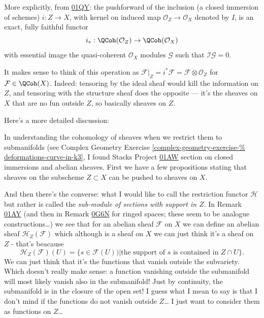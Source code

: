 \documentclass{book}
\begin{document}
More explicitly, from
\href{https://stacks.math.columbia.edu/tag/%
01QY}{01QY}:
the pushforward of the inclusion (a closed
immersion of schemes)
$i:Z \to X$, with kernel on induced map
$\mathcal{O}_Z \to \mathcal{O}_X$
denoted by $I$, is an exact, fully faithful
functor
$$
i_*:\QCoh(\mathcal{O}_Z) \to
\QCoh(\mathcal{O}_X)
$$
with essential image the quasi-coherent
$\mathcal{O}_X$ modules
$\mathcal{G}$ such that
$\mathcal{I}\mathcal{G}=0$.

It makes sense to think of this operation as
$\mathcal{F}|_Z=i^*\mathcal{F}=\mathcal{F}
\otimes\mathcal{O}_Z$
for $\mathcal{F}\in\QCoh(X)$.
Indeed: tensoring by the ideal sheaf would
kill the information on $Z$,
and tensoring with the structure sheaf does
the opposite
--- it's the sheaves on $X$ that are no fun
outside $Z$,
so basically sheaves on $Z$.

\medskip\noindent
Here's a more detailed discussion:

In understanding the cohomology of sheaves
when
we restrict them to submanifolds (see Complex
Geometry
Exercise
\ref{complex-geometry-exercise-%
deformations-curve-in-k3},
I found Stacks Project
\href{https://stacks.math.columbia.edu/tag/%
01AW}{01AW}
section on closed immersions and abelian
sheaves.
First we have a few propositions stating that
sheaves on the subscheme $Z \subset X$ can be
pushed
to sheaves on $X$.

And then there's the converse:
what I would like to call the restriction
functor $\mathcal{H}$
but rather is called the {\it sub-module of
sections with support in $Z$}.
In Remark
\href{https://stacks.math.columbia.edu/tag/%
01AY}{01AY}
(and then in Remark
\href{https://stacks.math.columbia.edu/tag/%
0G6N}{0G6N}
for ringed spaces; these seem to be analogue
constructions…)
we see that for an abelian sheaf
$\mathcal{F}$ on $X$
we can define an abelian sheaf
$\mathcal{H}_Z(\mathcal{F})$
which although is a sheaf on $X$
we can just think it's a sheaf on $Z$ -
that's beacause
$$
\mathcal{H}_Z(\mathcal{F})(U)
=\{s \in \mathcal{F}(U))| \text{the support
of $s$ is contained in }Z\cap U\}.
$$
We can just think that it's the functions
that vanish outside the subvariety.
Which doesn't really make sense:
a function vanishing outside the submanifold
will most likely
vanish also in the submanifold! Just by
continuity,
the submanifold is in the closure of the open
set!
I guess what I mean to say is that I don't
mind if
the functions do not vanish outside $Z$…
I just want to consider them as functions on
$Z$…
\end{document}
